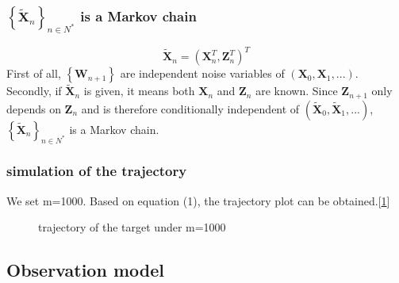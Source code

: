 \documentclass{article}
\begin{document}
\subsubsection{$\left\{\tilde{\boldsymbol{X}}_n\right\}_{n\in{N^*}}$ is a Markov chain} 
\begin{equation}
    \tilde{\boldsymbol{X}}_n= (\boldsymbol{X}_n^T,\boldsymbol{Z}_n^T)^T
\end{equation}
First of all, $\left\{\boldsymbol{W}_{n+1}\right\}$ are independent noise variables of $(\boldsymbol{X}_0,\boldsymbol{X}_1,...)$. Secondly, if $\tilde{\boldsymbol{X}}_n$ is given, it means both $\boldsymbol{X}_{n}$ and $\boldsymbol{Z}_{n}$ are known. Since $\boldsymbol{Z}_{n+1}$ only depends on $\boldsymbol{Z}_n$ and is therefore conditionally independent of $(\tilde{\boldsymbol{X}}_0,\tilde{\boldsymbol{X}}_1,...)$,  $\left\{\tilde{\boldsymbol{X}}_n\right\}_{n\in{N^*}}$ is a Markov chain.

\subsubsection{simulation of the trajectory}

We set m=1000. Based on equation (1), the trajectory plot can be obtained.[\ref{1}]

\begin{figure}[h]
        \caption{\label{1} trajectory of the target under m=1000}
        \end{figure}

\subsection{Observation model}
\end{document}

